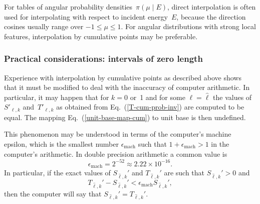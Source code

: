 For tables of angular probability densities~$\pi( \mu \mid E)$, direct interpolation
is often used for interpolating with respect to incident energy~$E$,
because the direction cosines usually range over $-1 \le \mu \le 1$.
For angular distributions with strong local features, interpolation by cumulative points 
may be preferable.


\subsubsection{Practical considerations: intervals of zero length} 
\label{Sec:cum-points-trivial}
Experience with interpolation
by cumulative points as described above shows that it must be
modified to deal with the inaccuracy of
computer arithmetic.  In particular, it may happen that 
for $k=0$ or~1 and for some $\ell = \widehat \ell$
the values of $S'_{ \ell,k}$ and~$T'_{ \ell,k}$
as obtained from Eq.~(\ref{T-cum-prob-inv}) are computed to be equal.
The mapping Eq.~(\ref{unit-base-map-cum}) to unit base is then undefined.

This phenomenon may be understood in terms of the computer's
machine epsilon, which is the smallest number $\epsilon_{\text{mach}}$
such that $1 + \epsilon_{\text{mach}} > 1$ in the computer's arithmetic.
In double precision arithmetic a common value is
$$
  \epsilon_{\text{mach}}  = 2^{-52} \approx 2.22 \times 10^{-16}.
$$
In particular, if the exact values of $S_{\widehat \ell,k}' $ and $T_{\widehat \ell,k}' $
are such that $S_{\widehat \ell,k}' > 0$ and
$$
  T_{\widehat \ell,k}'  - S_{\widehat \ell,k}'  < \epsilon_{\text{mach}} S_{\widehat \ell,k}',
$$
then the computer will say that $S_{\widehat \ell,k}' = T_{\widehat \ell,k}'$.

